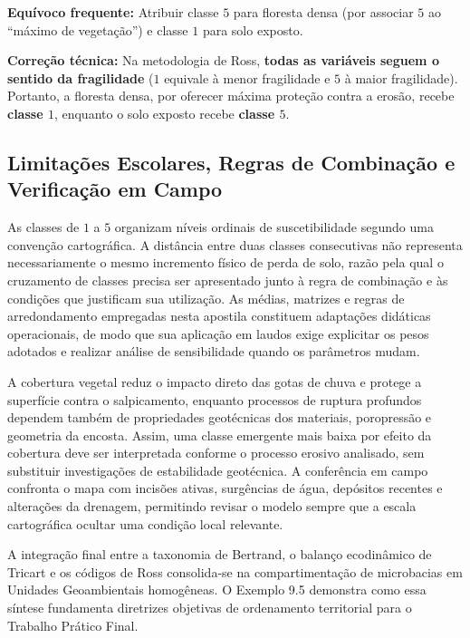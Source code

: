 \begin{boxErro}
\textbf{Equívoco frequente:} Atribuir classe $5$ para floresta densa (por associar $5$ ao ``máximo de vegetação'') e classe $1$ para solo exposto.\par
\textbf{Correção técnica:} Na metodologia de Ross, \textbf{todas as variáveis seguem o sentido da fragilidade} ($1$ equivale à menor fragilidade e $5$ à maior fragilidade). Portanto, a floresta densa, por oferecer máxima proteção contra a erosão, recebe \textbf{classe $1$}, enquanto o solo exposto recebe \textbf{classe $5$}.
\end{boxErro}

\subsection{Limitações Escolares, Regras de Combinação e Verificação em Campo}

As classes de $1$ a $5$ organizam níveis ordinais de suscetibilidade segundo uma convenção cartográfica. A distância entre duas classes consecutivas não representa necessariamente o mesmo incremento físico de perda de solo, razão pela qual o cruzamento de classes precisa ser apresentado junto à regra de combinação e às condições que justificam sua utilização. As médias, matrizes e regras de arredondamento empregadas nesta apostila constituem adaptações didáticas operacionais, de modo que sua aplicação em laudos exige explicitar os pesos adotados e realizar análise de sensibilidade quando os parâmetros mudam.

A cobertura vegetal reduz o impacto direto das gotas de chuva e protege a superfície contra o salpicamento, enquanto processos de ruptura profundos dependem também de propriedades geotécnicas dos materiais, poropressão e geometria da encosta. Assim, uma classe emergente mais baixa por efeito da cobertura deve ser interpretada conforme o processo erosivo analisado, sem substituir investigações de estabilidade geotécnica. A conferência em campo confronta o mapa com incisões ativas, surgências de água, depósitos recentes e alterações da drenagem, permitindo revisar o modelo sempre que a escala cartográfica ocultar uma condição local relevante.


A integração final entre a taxonomia de Bertrand, o balanço ecodinâmico de Tricart e os códigos de Ross consolida-se na compartimentação de microbacias em Unidades Geoambientais homogêneas. O Exemplo 9.5 demonstra como essa síntese fundamenta diretrizes objetivas de ordenamento territorial para o Trabalho Prático Final.

